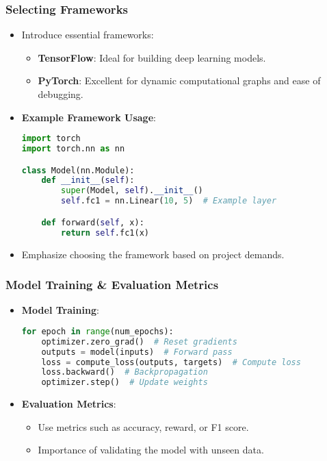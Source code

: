 \documentclass[aspectratio=169]{beamer}
\begin{document}
\begin{frame}[fragile]
    \frametitle{Selecting Frameworks}
    \begin{itemize}
        \item Introduce essential frameworks:
            \begin{itemize}
                \item \textbf{TensorFlow}: Ideal for building deep learning models.
                \item \textbf{PyTorch}: Excellent for dynamic computational graphs and ease of debugging.
            \end{itemize}
        \item \textbf{Example Framework Usage}:
        \begin{lstlisting}[language=Python]
import torch
import torch.nn as nn

class Model(nn.Module):
    def __init__(self):
        super(Model, self).__init__()
        self.fc1 = nn.Linear(10, 5)  # Example layer

    def forward(self, x):
        return self.fc1(x)
        \end{lstlisting}
        \item Emphasize choosing the framework based on project demands.
    \end{itemize}
\end{frame}

\begin{frame}[fragile]
    \frametitle{Model Training & Evaluation Metrics}
    \begin{itemize}
        \item \textbf{Model Training}:
        \begin{lstlisting}[language=Python]
for epoch in range(num_epochs):
    optimizer.zero_grad()  # Reset gradients
    outputs = model(inputs)  # Forward pass
    loss = compute_loss(outputs, targets)  # Compute loss
    loss.backward()  # Backpropagation
    optimizer.step()  # Update weights
        \end{lstlisting}
        \item \textbf{Evaluation Metrics}:
            \begin{itemize}
                \item Use metrics such as accuracy, reward, or F1 score.
                \item Importance of validating the model with unseen data.
            \end{itemize}
    \end{itemize}
\end{frame}
\end{document}
